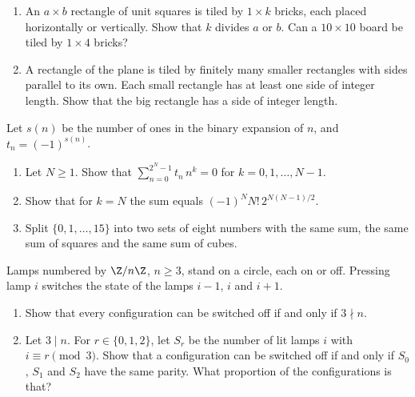 \begin{exercise}[$\star\star$]\label{pb:bricks}
\begin{enumerate}[label=(\alph*)]
\item An $a\times b$ rectangle of unit squares is tiled by $1\times k$ bricks, each placed horizontally or vertically.
Show that $k$ divides $a$ or $b$. Can a $10\times10$ board be tiled by $1\times4$ bricks?
\item A rectangle of the plane is tiled by finitely many smaller rectangles with sides parallel to its own. Each small
rectangle has at least one side of integer length. Show that the big rectangle has a side of integer length.
\end{enumerate}
\end{exercise}

\begin{exercise}[$\star\star$]\label{pb:prouhet}
Let $s(n)$ be the number of ones in the binary expansion of $n$, and $t_n=(-1)^{s(n)}$.
\begin{enumerate}[label=(\alph*)]
\item Let $N\ge1$. Show that $\sum_{n=0}^{2^N-1}t_n\,n^k=0$ for $k=0,1,\dots,N-1$.
\item Show that for $k=N$ the sum equals $(-1)^NN!\,2^{N(N-1)/2}$.
\item Split $\{0,1,\dots,15\}$ into two sets of eight numbers with the same sum, the same sum of squares and the same sum
of cubes.
\end{enumerate}
\end{exercise}

\begin{exercise}[$\star\star$]\label{pb:lightsout}
Lamps numbered by $\Z/n\Z$, $n\ge3$, stand on a circle, each on or off. Pressing lamp $i$ switches the state of the lamps
$i-1$, $i$ and $i+1$.
\begin{enumerate}[label=(\alph*)]
\item Show that every configuration can be switched off if and only if $3\nmid n$.
\item Let $3\mid n$. For $r\in\{0,1,2\}$, let $S_r$ be the number of lit lamps $i$ with $i\equiv r\pmod3$. Show that a
configuration can be switched off if and only if $S_0$, $S_1$ and $S_2$ have the same parity. What proportion of the
configurations is that?
\end{enumerate}
\end{exercise}


